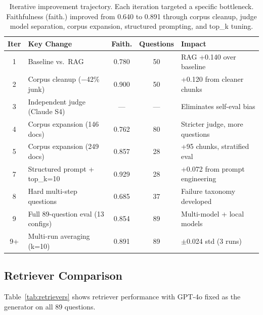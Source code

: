 \documentclass{article}
\begin{document}
\begin{table}[t]
  \caption{Iterative improvement trajectory. Each iteration targeted a specific bottleneck. Faithfulness (faith.) improved from 0.640 to 0.891 through corpus cleanup, judge model separation, corpus expansion, structured prompting, and top\_k tuning.}
  \label{tab:iterations}
  \centering
  \small
  \begin{tabular}{clccl}
    \toprule
    Iter & Key Change & Faith. & Questions & Impact \\
    \midrule
    1 & Baseline vs.\ RAG & 0.780 & 50 & RAG +0.140 over baseline \\
    2 & Corpus cleanup ($-$42\% junk) & 0.900 & 50 & +0.120 from cleaner chunks \\
    3 & Independent judge (Claude S4) & --- & --- & Eliminates self-eval bias \\
    4 & Corpus expansion (146 docs) & 0.762 & 80 & Stricter judge, more questions \\
    5 & Corpus expansion (249 docs) & 0.857 & 28 & +95 chunks, stratified eval \\
    7 & Structured prompt + top\_k=10 & 0.929 & 28 & +0.072 from prompt engineering \\
    8 & Hard multi-step questions & 0.685 & 37 & Failure taxonomy developed \\
    9 & Full 89-question eval (13 configs) & 0.854 & 89 & Multi-model + local models \\
    9+ & Multi-run averaging (k=10) & 0.891 & 89 & $\pm$0.024 std (3 runs) \\
    \bottomrule
  \end{tabular}
\end{table}

\subsection{Retriever Comparison}
\label{sec:retriever_comparison}

Table~\ref{tab:retrievers} shows retriever performance with GPT-4o fixed as the generator on all 89 questions.
\end{document}
